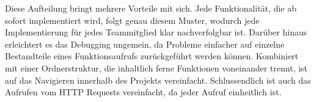 Diese Aufteilung bringt mehrere Vorteile mit sich.
Jede Funktionalität, die ab sofort implementiert wird, folgt genau diesem Muster, wodurch jede Implementierung für jedes Teammitglied klar nachverfolgbar ist.
Darüber hinaus erleichtert es das Debugging ungemein, da Probleme einfacher auf einzelne Bestandteile eines Funktionsaufrufs zurückgeführt werden können.
Kombiniert mit einer Ordnerstruktur, die inhaltlich ferne Funktionen voneinander trennt, ist auf das Navigieren innerhalb des Projekts vereinfacht.
Schlussendlich ist auch das Aufrufen vom HTTP Requests vereinfacht, da jeder Aufruf einheitlich ist.